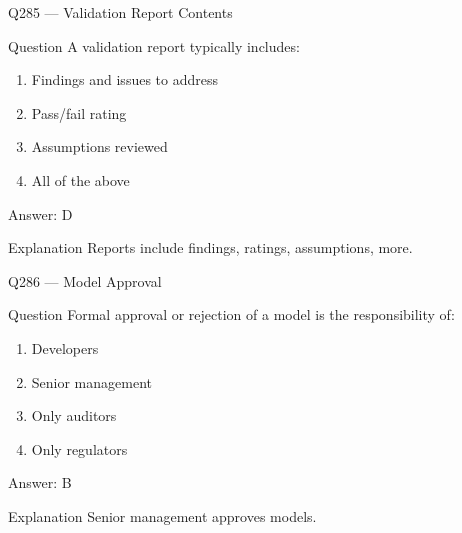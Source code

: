 \documentclass[aspectratio=169,8pt]{beamer}
\begin{document}
										\begin{frame}{Q285 --- Validation Report Contents}
											\begin{block}{Question}
												A validation report typically includes:
												\begin{enumerate}
													\item Findings and issues to address
													\item Pass/fail rating
													\item Assumptions reviewed
													\item All of the above
												\end{enumerate}
											\end{block}
											\begin{exampleblock}{Answer: D}\end{exampleblock}
											\begin{block}{Explanation}
												Reports include findings, ratings, assumptions, more.
											\end{block}
										\end{frame}
										
										\begin{frame}{Q286 --- Model Approval}
											\begin{block}{Question}
												Formal approval or rejection of a model is the responsibility of:
												\begin{enumerate}
													\item Developers
													\item Senior management
													\item Only auditors
													\item Only regulators
												\end{enumerate}
											\end{block}
											\begin{exampleblock}{Answer: B}\end{exampleblock}
											\begin{block}{Explanation}
												Senior management approves models.
											\end{block}
										\end{frame}
										
\end{document}
